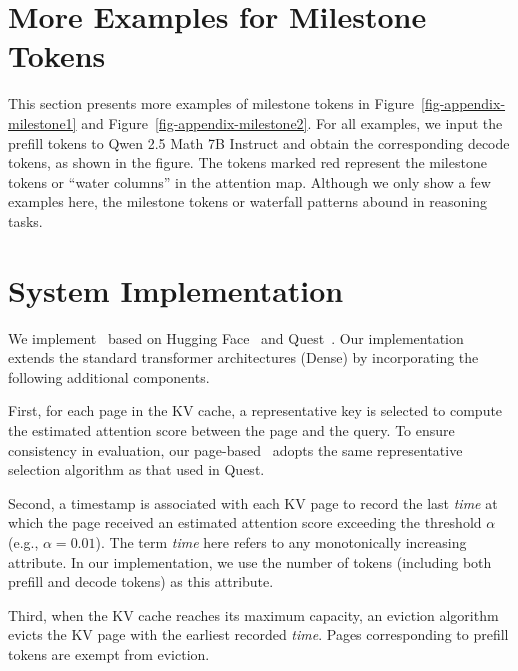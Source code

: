 \section{More Examples for Milestone Tokens}

This section presents more examples of milestone tokens in Figure~\ref{fig-appendix-milestone1} and Figure~\ref{fig-appendix-milestone2}. For all examples, we input the prefill tokens to Qwen 2.5 Math 7B Instruct and obtain the corresponding decode tokens, as shown in the figure. The tokens marked red represent the milestone tokens or ``water columns'' in the attention map. Although we only show a few examples here, the milestone tokens or waterfall patterns abound in reasoning tasks.





% 

\section{System Implementation}

We implement \algo\ based on Hugging Face~\cite{hf} and Quest~\cite{tang2024quest}.
Our implementation extends the standard transformer architectures (Dense) by incorporating the following additional components.

First, for each page in the KV cache, a representative key is selected to compute the estimated attention score between the page and the query.
To ensure consistency in evaluation, our page-based \algo\ adopts the same representative selection algorithm as that used in Quest.

Second, a timestamp is associated with each KV page to record the last \textit{time} at which the page received an estimated attention score exceeding the threshold $\alpha$ (e.g., $\alpha=0.01$). The term \textit{time} here refers to any monotonically increasing attribute.
In our implementation, we use the number of tokens (including both prefill and decode tokens) as this attribute.

Third, when the KV cache reaches its maximum capacity, an eviction algorithm evicts the KV page with the earliest recorded \textit{time}. Pages corresponding to prefill tokens are exempt from eviction.

